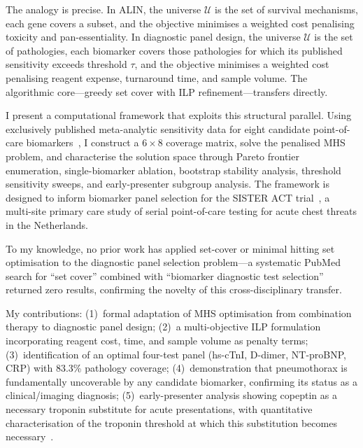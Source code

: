 \documentclass[times, twoside, watermark]{zHenriquesLab-StyleBioRxiv}
\begin{document}
The analogy is precise. In ALIN, the universe $\mathcal{U}$ is the set of survival mechanisms, each gene covers a subset, and the objective minimises a weighted cost penalising toxicity and pan-essentiality. In diagnostic panel design, the universe $\mathcal{U}$ is the set of pathologies, each biomarker covers those pathologies for which its published sensitivity exceeds threshold $\tau$, and the objective minimises a weighted cost penalising reagent expense, turnaround time, and sample volume. The algorithmic core---greedy set cover with ILP refinement---transfers directly.

I present a computational framework that exploits this structural parallel. Using exclusively published meta-analytic sensitivity data for eight candidate point-of-care biomarkers~\cite{Lipinski2015,Geersing2012,Maisel2002,Nazerian2014,Keller2011,Raskovalova2013,Body2015,Imazio2011,Crawford2019}, I construct a $6 \times 8$ coverage matrix, solve the penalised MHS problem, and characterise the solution space through Pareto frontier enumeration, single-biomarker ablation, bootstrap stability analysis, threshold sensitivity sweeps, and early-presenter subgroup analysis. The framework is designed to inform biomarker panel selection for the SISTER ACT trial~\cite{SISTERACT2024}, a multi-site primary care study of serial point-of-care testing for acute chest threats in the Netherlands.

To my knowledge, no prior work has applied set-cover or minimal hitting set optimisation to the diagnostic panel selection problem---a systematic PubMed search for ``set cover'' combined with ``biomarker diagnostic test selection'' returned zero results, confirming the novelty of this cross-disciplinary transfer.

My contributions: (1)~formal adaptation of MHS optimisation from combination therapy to diagnostic panel design; (2)~a multi-objective ILP formulation incorporating reagent cost, time, and sample volume as penalty terms; (3)~identification of an optimal four-test panel (hs-cTnI, D-dimer, NT-proBNP, CRP) with 83.3\% pathology coverage; (4)~demonstration that pneumothorax is fundamentally uncoverable by any candidate biomarker, confirming its status as a clinical/imaging diagnosis; (5)~early-presenter analysis showing copeptin as a necessary troponin substitute for acute presentations, with quantitative characterisation of the troponin threshold at which this substitution becomes necessary~\cite{Mu2023,Giannitsis2021}.


\end{document}
